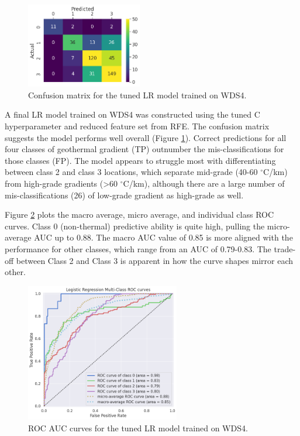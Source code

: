 \begin{figure}
\centering
\includegraphics[width=0.45\textwidth]{templates/images/Figure-LR-ConfusionMatrix.png}
\singlespacing
\caption[Logistic regression confusion matrix]{Confusion matrix for the tuned LR model trained on WDS4.}
\label{fig:logreg_conf_matrix}
\end{figure}
A final LR model trained on WDS4 was constructed using the tuned C hyperparameter and reduced feature set from RFE. The confusion matrix suggests the model performs well overall (Figure \ref{fig:logreg_conf_matrix}). Correct predictions for all four classes of geothermal gradient (TP) outnumber the mis-classifications for those classes (FP). The model appears to struggle most with differentiating between class 2 and class 3 locations, which separate mid-grade (40-60 $^\circ$C/km) from high-grade gradients (>60 $^\circ$C/km), although there are a large number of mis-classifications (26) of low-grade gradient as high-grade as well.

Figure \ref{fig:logreg_auc} plots the macro average, micro average, and individual class ROC curves. Class 0 (non-thermal) predictive ability is quite high, pulling the micro-average AUC up to 0.88.  The macro AUC value of 0.85 is more aligned with the performance for other classes, which range from an AUC of 0.79-0.83. The trade-off between Class 2 and Class 3 is apparent in how the curve shapes mirror each other.

\begin{figure}[!htp]
\centering
\includegraphics[width=0.6\textwidth]{templates/images/Figure-LR-AUC.png}
\singlespacing
\caption[Logistic regression AUC curves]{ROC AUC curves for the tuned LR model trained on WDS4.}
\label{fig:logreg_auc}
\end{figure}

